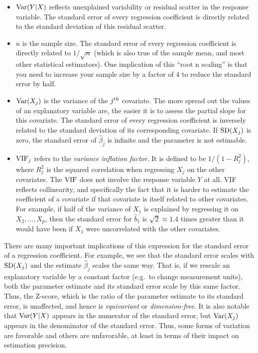 \begin{itemize}

\item ${\rm Var}(Y|X)$ reflects unexplained variability or residual scatter in the response variable.  The standard error of every regression coefficient is directly related to the standard deviation of this residual scatter.

\item $n$ is the sample size.  The standard error of every regression coefficient is directly related to $1/\sqrt{n}$ (which is also true of the sample mean, and most other statistical estimators).  One implication of this ``root n scaling'' is that you need to increase your sample size by a factor of 4 to reduce the standard error by half.

\item ${\rm Var}(X_j)$ is the variance of the $j^{\rm th}$ covariate.  The more spread out the values of an explanatory variable are, the easier it is to assess the partial slope for this covariate.  The standard error of every regression coefficient is inversely related to the standard deviation of its corresponding covariate.  If ${\rm SD}(X_j)$ is zero, the standard error of $\hat{\beta}_j$ is infinite and the parameter is not estimable.

\item ${\rm VIF}_j$ refers to the {\em variance inflation factor}.  It is defined to be $1 / (1 - R_j^2)$, where $R_j^2$ is the squared correlation when regressing $X_j$ on the other covariates.  The ${\rm VIF}$ does not involve the response variable $Y$ at all.  VIF reflects collinearity, and specifically the fact that it is harder to estimate the coefficient of a covariate if that covariate is itself related to other covariates.  For example, if half of the variance of $X_1$ is explained by regressing it on $X_2, \ldots, X_p$, then the standard error for $\hat{b}_1$ is $\sqrt{2} \approx 1.4$ times greater than it would have been if $X_1$ were uncorrelated with the other covariates.

\end{itemize}

There are many important implications of this expression for the standard error of a regression coefficient.  For example, we see that the standard error scales with ${\rm SD}(X_j)$ and the estimate $\hat{\beta}_j$ scales the same way.  That is, if we rescale an explanatory variable by a constant factor (e.g.\ to change measurement units), both the parameter estimate and its standard error scale by this same factor.  Thus, the Z-score, which is the ratio of the parameter estimate to its standard error, is unaffected, and hence is {\em equivariant} or {\em dimension-free}.  It is also notable that ${\rm Var}(Y|X)$ appears in the numerator of the standard error, but ${\rm Var}(X_j)$ appears in the denominator of the standard error.  Thus, some forms of variation are favorable and others are unfavorable, at least in terms of their impact on estimation precision.

